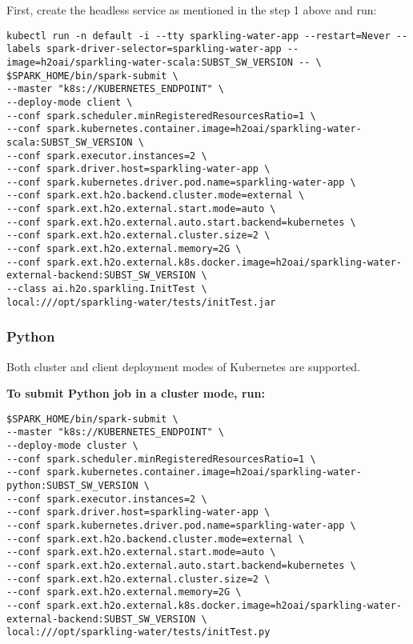 First, create the headless service as mentioned in the step 1 above and run:

\begin{lstlisting}[style=Bash]
kubectl run -n default -i --tty sparkling-water-app --restart=Never --labels spark-driver-selector=sparkling-water-app --image=h2oai/sparkling-water-scala:SUBST_SW_VERSION -- \
$SPARK_HOME/bin/spark-submit \
--master "k8s://KUBERNETES_ENDPOINT" \
--deploy-mode client \
--conf spark.scheduler.minRegisteredResourcesRatio=1 \
--conf spark.kubernetes.container.image=h2oai/sparkling-water-scala:SUBST_SW_VERSION \
--conf spark.executor.instances=2 \
--conf spark.driver.host=sparkling-water-app \
--conf spark.kubernetes.driver.pod.name=sparkling-water-app \
--conf spark.ext.h2o.backend.cluster.mode=external \
--conf spark.ext.h2o.external.start.mode=auto \
--conf spark.ext.h2o.external.auto.start.backend=kubernetes \
--conf spark.ext.h2o.external.cluster.size=2 \
--conf spark.ext.h2o.external.memory=2G \
--conf spark.ext.h2o.external.k8s.docker.image=h2oai/sparkling-water-external-backend:SUBST_SW_VERSION \
--class ai.h2o.sparkling.InitTest \
local:///opt/sparkling-water/tests/initTest.jar
\end{lstlisting}

\subsubsection{Python}

Both cluster and client deployment modes of Kubernetes are supported.

\textbf{To submit Python job in a cluster mode, run:}

\begin{lstlisting}[style=Bash]
$SPARK_HOME/bin/spark-submit \
--master "k8s://KUBERNETES_ENDPOINT" \
--deploy-mode cluster \
--conf spark.scheduler.minRegisteredResourcesRatio=1 \
--conf spark.kubernetes.container.image=h2oai/sparkling-water-python:SUBST_SW_VERSION \
--conf spark.executor.instances=2 \
--conf spark.driver.host=sparkling-water-app \
--conf spark.kubernetes.driver.pod.name=sparkling-water-app \
--conf spark.ext.h2o.backend.cluster.mode=external \
--conf spark.ext.h2o.external.start.mode=auto \
--conf spark.ext.h2o.external.auto.start.backend=kubernetes \
--conf spark.ext.h2o.external.cluster.size=2 \
--conf spark.ext.h2o.external.memory=2G \
--conf spark.ext.h2o.external.k8s.docker.image=h2oai/sparkling-water-external-backend:SUBST_SW_VERSION \
local:///opt/sparkling-water/tests/initTest.py
\end{lstlisting}

